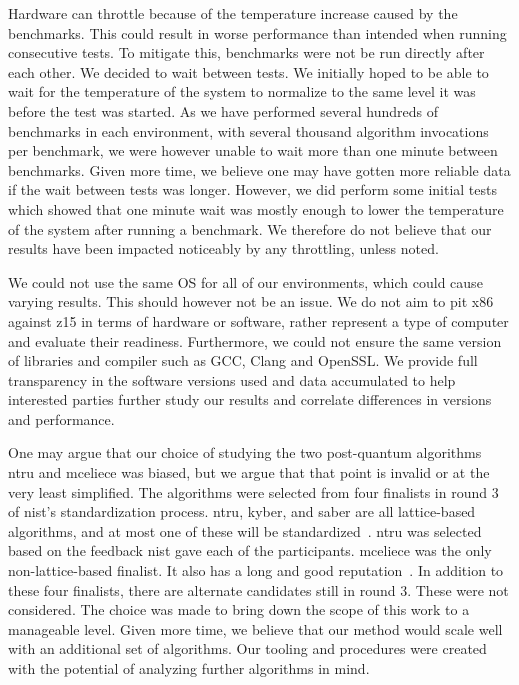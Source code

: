 Hardware can throttle because of the temperature increase caused by the benchmarks. This could result in worse performance than intended when running consecutive tests. To mitigate this, benchmarks were not be run directly after each other. We decided to wait between tests. We initially hoped to be able to wait for the temperature of the system to normalize to the same level it was before the test was started. As we have performed several hundreds of benchmarks in each environment, with several thousand algorithm invocations per benchmark, we were however unable to wait more than one minute between benchmarks. Given more time, we believe one may have gotten more reliable data if the wait between tests was longer. However, we did perform some initial tests which showed that one minute wait was mostly enough to lower the temperature of the system after running a benchmark. We therefore do not believe that our results have been impacted noticeably by any throttling, unless noted. 

We could not use the same OS for all of our environments, which could cause varying results. This should however not be an issue. We do not aim to pit \gls{x86} against \gls{z15} in terms of hardware or software, rather represent a type of computer and evaluate their readiness. Furthermore, we could not ensure the same version of libraries and compiler such as GCC, Clang and OpenSSL. We provide full transparency in the software versions used and data accumulated to help interested parties further study our results and correlate differences in versions and performance.

One may argue that our choice of studying the two post-quantum algorithms \gls{ntru} and \gls{mceliece} was biased, but we argue that that point is invalid or at the very least simplified. The algorithms were selected from four finalists in round 3 of \gls{nist}'s standardization process. \gls{ntru}, \gls{kyber}, and \gls{saber} are all lattice-based algorithms, and at most one of these will be standardized~\cite{nist2020}. \gls{ntru} was selected based on the feedback \gls{nist} gave each of the participants. \gls{mceliece} was the only non-lattice-based finalist. It also has a long and good reputation~\cite{nist2020}. In addition to these four finalists, there are alternate candidates still in round 3. These were not considered. The choice was made to bring down the scope of this work to a manageable level. Given more time, we believe that our method would scale well with an additional set of algorithms. Our tooling and procedures were created with the potential of analyzing further algorithms in mind.

